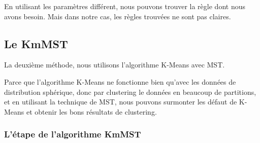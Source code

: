 En utilisant les paramètres différent, nous pouvons trouver la règle dont nous avons besoin. Mais dans notre cas, les règles trouvées ne sont pas claires.

\subsection{Le KmMST}
La deuxième méthode, nous utilisons l'algorithme K-Means avec MST.

Parce que l'algorithme K-Means ne fonctionne bien qu'avec les données de distribution sphérique, donc par clustering le données en beaucoup de partitions, et en utilisant la technique de MST, nous pouvons surmonter les défaut de K-Means et obtenir les bons résultats de clustering.
 
  \subsubsection{L'étape de l'algorithme KmMST}
  

